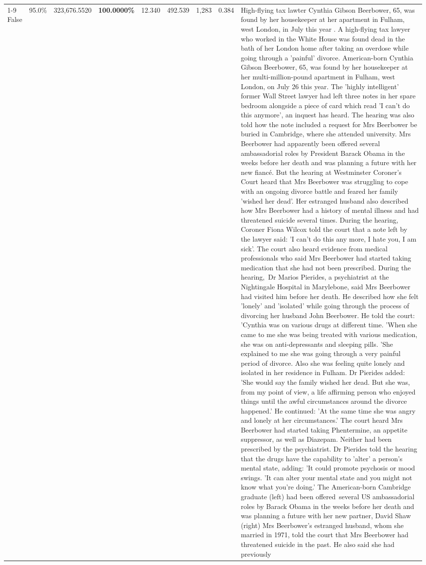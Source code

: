 \begin{table}[H]
\begin{tabular}{lllrlllll}
\cline{1-9}
False & 95.0\% & 323,676.5520 & \bfseries \color{red} 100.0000\% & 12.340 & 492.539 & 1,283 & 0.384 & High-flying tax lawter Cynthia Gibson Beerbower, 65, was found by her housekeeper at her apartment in Fulham, west London, in July this year . A high-flying tax lawyer who worked in the White House was found dead in the bath of her London home after taking an overdose while going through a 'painful' divorce. American-born Cynthia Gibson Beerbower, 65, was found by her housekeeper at her multi-million-pound apartment in Fulham, west London, on July 26 this year. The 'highly intelligent' former Wall Street lawyer had left three notes in her spare bedroom alongside a piece of card which read 'I can't do this anymore', an inquest has heard. The hearing was also told how the note included a request for Mrs Beerbower be buried in Cambridge, where she attended university. Mrs Beerbower had apparently been offered several ambassadorial roles by President Barack Obama in the weeks before her death and was planning a future with her new fiancé. But the hearing at Westminster Coroner's Court heard that Mrs Beerbower was struggling to cope with an ongoing divorce battle and feared her family 'wished her dead'. Her estranged husband also described how Mrs Beerbower had a history of mental illness and had threatened suicide several times. During the hearing, Coroner Fiona Wilcox told the court that a note left by the lawyer said: 'I can't do this any more, I hate you, I am sick'. The court also heard evidence from medical professionals who said Mrs Beerbower had started taking medication that she had not been prescribed. During the hearing, Dr Marios Pierides, a psychiatrist at the Nightingale Hospital in Marylebone, said Mrs Beerbower had visited him before her death. He described how she felt 'lonely' and 'isolated' while going through the process of divorcing her husband John Beerbower. He told the court: 'Cynthia was on various drugs at different time. 'When she came to me she was being treated with various medication, she was on anti-depressants and sleeping pills. 'She explained to me she was going through a very painful period of divorce. Also she was feeling quite lonely and isolated in her residence in Fulham. Dr Pierides added: 'She would say the family wished her dead. But she was, from my point of view, a life affirming person who enjoyed things until the awful circumstances around the divorce happened.' He continued: 'At the same time she was angry and lonely at her circumstances.' The court heard Mrs Beerbower had started taking Phentermine, an appetite suppressor, as well as Diazepam. Neither had been prescribed by the psychiatrist. Dr Pierides told the hearing that the drugs have the capability to 'alter' a person's mental state, adding: 'It could promote psychosis or mood swings. 'It can alter your mental state and you might not know what you're doing.' The American-born Cambridge graduate (left) had been offered several US ambassadorial roles by Barack Obama in the weeks before her death and was planning a future with her new partner, David Shaw (right) Mrs Beerbower's estranged husband, whom she married in 1971, told the court that Mrs Beerbower had threatened suicide in the past. He also said she had previously 
\end{tabular}
\end{table}
